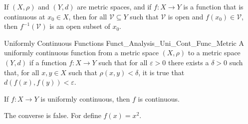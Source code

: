             \begin{theorem}
                If $(X,\rho)$ and $(Y,d)$ are metric spaces, and if
                $f:X\rightarrow{Y}$ is a function that is
                continuous at $x_{0}\in{X}$, then for
                all $\mathcal{V}\subseteq{Y}$ such that
                $\mathcal{V}$ is open and $f(x_{0})\in\mathcal{V}$,
                then $f^{-1}(\mathcal{V})$ is an open subset
                of $x_{0}$.
            \end{theorem}
            \begin{ldefinition}{Uniformly Continuous Functions}
                  {Funct_Analysis_Uni_Cont_Func_Metric}
                A uniformly continuous function from a metric space
                $(X,\rho)$ to a metric space $(Y,d)$ if a function
                $f:X\rightarrow{Y}$ such that for all
                $\varepsilon>0$ there exists a $\delta>0$ such
                that, for all $x,y\in{X}$ such that
                $\rho(x,y)<\delta$, it is true that
                $d(f(x),f(y))<\varepsilon$.
            \end{ldefinition}
            \begin{theorem}
                If $f:X\rightarrow{Y}$ is uniformly continuous,
                then $f$ is continuous.
            \end{theorem}
            The converse is false. For define $f(x)=x^{2}$.
